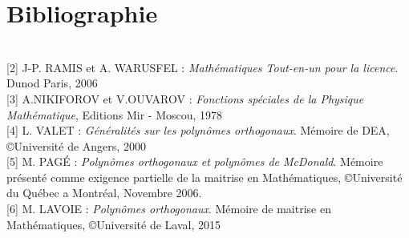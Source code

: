 \chapter{Bibliographie}
\\$ $\\$ $[2]        J-P. RAMIS et A. WARUSFEL : \textit{Mathématiques Tout-en-un pour la licence}. Dunod Paris, 2006
\\$ $\\$ $[3]        A.NIKIFOROV et V.OUVAROV : \textit{Fonctions spéciales de la Physique Mathématique}, Editions Mir - Moscou, 1978
\\$ $\\$ $[4]        L. VALET : \textit{Généralités sur les polynômes orthogonaux}. Mémoire de DEA, \copyright Université de Angers, 2000
\\$ $\\$ $[5]        M. PAGÉ : \textit{Polynômes orthogonaux et polynômes de McDonald}. Mémoire présenté comme exigence partielle de la maitrise en Mathématiques, \copyright Université du Québec a Montréal, Novembre 2006.
\\$ $\\$ $[6]        M. LAVOIE : \textit{Polynômes orthogonaux}. Mémoire de maitrise en Mathématiques, \copyright Université de Laval, 2015